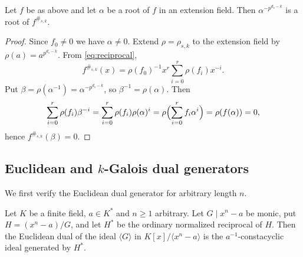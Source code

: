 \begin{lemma}\label{lem:root-action}
Let $f$ be as above and let $\alpha$ be a root of $f$ in an extension field.
Then $\alpha^{-p^{d_s-k}}$ is a root of $f^{\#_{s,k}}$.
\end{lemma}

\begin{proof}
Since $f_0\neq0$ we have $\alpha\neq0$.  Extend $\rho=\rho_{s,k}$ to the
extension field by $\rho(a)=a^{p^{d_s-k}}$.  From \eqref{eq:reciprocal},
\[
f^{\#_{s,k}}(x)=\rho(f_0)^{-1}x^r\sum_{i=0}^{r}\rho(f_i)x^{-i}.
\]
Put $\beta=\rho(\alpha^{-1})=\alpha^{-p^{d_s-k}}$, so
$\beta^{-1}=\rho(\alpha)$.  Then
\[
\sum_{i=0}^{r}\rho(f_i)\beta^{-i}
   =\sum_{i=0}^{r}\rho(f_i)\rho(\alpha)^i
   =\rho\Bigl(\sum_{i=0}^{r}f_i\alpha^i\Bigr)=\rho(f(\alpha))=0,
\]
hence $f^{\#_{s,k}}(\beta)=0$.
\end{proof}

\subsection{Euclidean and \texorpdfstring{$k$}{k}-Galois dual
generators}\label{sec:dual-generators}

We first verify the Euclidean dual generator for arbitrary length $n$.

\begin{lemma}\label{lem:euclidean-dual}
Let $K$ be a finite field, $a\in K^\ast$ and $n\geq1$ arbitrary.  Let
$G\mid x^n-a$ be monic, put $H=(x^n-a)/G$, and let $H^\ast$ be the ordinary
normalized reciprocal of $H$.  Then the Euclidean dual of the ideal
$\langle G\rangle$ in $K[x]/\langle x^n-a\rangle$ is the
$a^{-1}$-constacyclic ideal generated by $H^\ast$.
\end{lemma}

